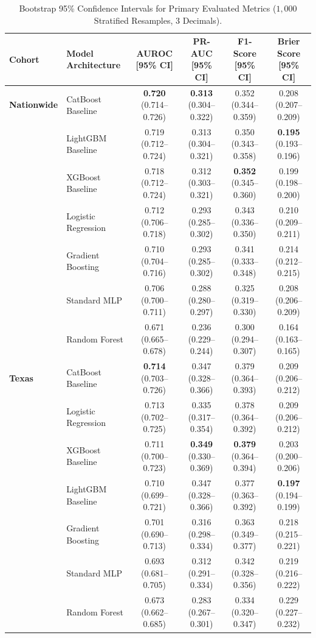\documentclass[10pt,journal]{IEEEtran}
\begin{document}
\begin{table}[!t]
\caption{Bootstrap 95\% Confidence Intervals for Primary Evaluated Metrics ($1{,}000$ Stratified Resamples, 3 Decimals).}
\label{tab:s_bootstrap_ci}
\centering
\footnotesize
\begin{tabular}{llcccc}
\toprule
\textbf{Cohort} & \textbf{Model Architecture} & \textbf{AUROC [95\% CI]} & \textbf{PR-AUC [95\% CI]} & \textbf{F1-Score [95\% CI]} & \textbf{Brier Score [95\% CI]} \\
\midrule
\textbf{Nationwide} & CatBoost Baseline & \textbf{0.720} (0.714--0.726) & \textbf{0.313} (0.304--0.322) & 0.352 (0.344--0.359) & 0.208 (0.207--0.209) \\
 & LightGBM Baseline & 0.719 (0.712--0.724) & 0.313 (0.304--0.321) & 0.350 (0.343--0.358) & \textbf{0.195} (0.193--0.196) \\
 & XGBoost Baseline & 0.718 (0.712--0.724) & 0.312 (0.303--0.321) & \textbf{0.352} (0.345--0.360) & 0.199 (0.198--0.200) \\
 & Logistic Regression & 0.712 (0.706--0.718) & 0.293 (0.285--0.302) & 0.343 (0.336--0.350) & 0.210 (0.209--0.211) \\
 & Gradient Boosting & 0.710 (0.704--0.716) & 0.293 (0.285--0.302) & 0.341 (0.333--0.348) & 0.214 (0.212--0.215) \\
 & Standard MLP & 0.706 (0.700--0.711) & 0.288 (0.280--0.297) & 0.325 (0.319--0.330) & 0.208 (0.206--0.209) \\
 & Random Forest & 0.671 (0.665--0.678) & 0.236 (0.229--0.244) & 0.300 (0.294--0.307) & 0.164 (0.163--0.165) \\
\midrule
\textbf{Texas} & CatBoost Baseline & \textbf{0.714} (0.703--0.726) & 0.347 (0.328--0.366) & 0.379 (0.364--0.393) & 0.209 (0.206--0.212) \\
 & Logistic Regression & 0.713 (0.702--0.725) & 0.335 (0.317--0.354) & 0.378 (0.364--0.392) & 0.209 (0.206--0.212) \\
 & XGBoost Baseline & 0.711 (0.700--0.723) & \textbf{0.349} (0.330--0.369) & \textbf{0.379} (0.364--0.394) & 0.203 (0.200--0.206) \\
 & LightGBM Baseline & 0.710 (0.699--0.721) & 0.347 (0.328--0.366) & 0.377 (0.363--0.392) & \textbf{0.197} (0.194--0.199) \\
 & Gradient Boosting & 0.701 (0.690--0.713) & 0.316 (0.298--0.334) & 0.363 (0.349--0.377) & 0.218 (0.215--0.221) \\
 & Standard MLP & 0.693 (0.681--0.705) & 0.312 (0.291--0.334) & 0.342 (0.328--0.356) & 0.219 (0.216--0.222) \\
 & Random Forest & 0.673 (0.662--0.685) & 0.283 (0.267--0.301) & 0.334 (0.320--0.347) & 0.229 (0.227--0.232) \\
\bottomrule
\end{tabular}
\end{table}
\end{document}
